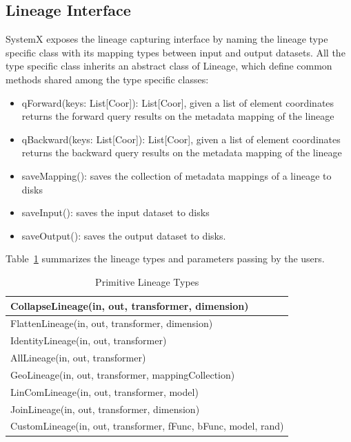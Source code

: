 \documentclass{sig-alternate}
\newenvironment{shortlist}{
        \vspace*{-0.5em}
  \begin{itemize}
  \setlength{\itemsep}{-0.1em}
}{
  \end{itemize}
        \vspace*{-0.5em}
}
\begin{document}
\subsection{Lineage Interface}
\label{sec:Design-Lineage}
SystemX exposes the lineage capturing interface by naming the lineage type specific class with its mapping types between input and output datasets.
All the type specific class inherits an abstract class of Lineage, which define common methods shared among the type specific classes:
\begin{shortlist}
\item{} qForward(keys: List[Coor]): List[Coor], given a list of element coordinates returns the forward query results on the metadata mapping of the lineage
\item{} qBackward(keys: List[Coor]): List[Coor], given a list of element coordinates returns the backward query results on the metadata mapping of the lineage
\item{} saveMapping(): saves the collection of metadata mappings of a lineage to disks
\item{} saveInput(): saves the input dataset to disks
\item{} saveOutput(): saves the output dataset to disks.
\end{shortlist}


Table~\ref{tb:lineage-interface} summarizes the lineage types and parameters passing by the users.
\begin{table}[t]
\begin{center}
    \caption{Primitive Lineage Types}
    \begin{scriptsize}
    \begin{tabular}{ | p{8cm}|}
    \hline
    CollapseLineage(in, out, transformer, dimension) \\ \hline 
    FlattenLineage(in, out, transformer, dimension) \\ \hline
    IdentityLineage(in, out, transformer) \\ \hline
    AllLineage(in, out, transformer) \\ \hline
    GeoLineage(in, out, transformer, mappingCollection) \\ \hline
    LinComLineage(in, out, transformer, model) \\ \hline
    JoinLineage(in, out, transformer, dimension) \\ \hline
    CustomLineage(in, out, transformer, fFunc, bFunc, model, rand) \\ \hline
    \end{tabular}
    \end{scriptsize}
    \label{tb:lineage-interface}
\end{center}   
\end{table}
\end{document}
